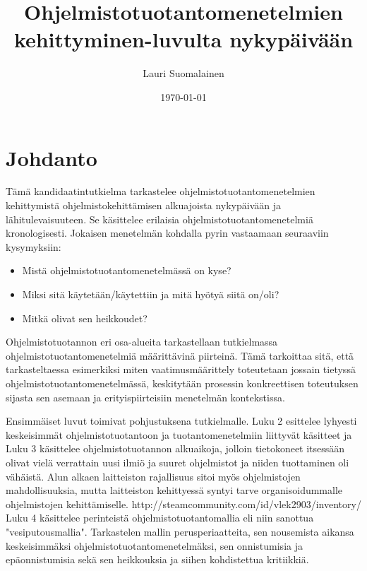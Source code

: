 \documentclass[finnish,12pt]{tktltiki2}
\title{Ohjelmistotuotantomenetelmien kehittyminen\newline 1950-luvulta nykypäivään}
\author{Lauri Suomalainen}
\date{\today}
\theoremstyle{definition}
\theoremstyle{remark}
\begin{document}

\frontmatter      %

\maketitle        %
\makeabstract     %

\tableofcontents  %


\mainmatter       %

\section{Johdanto}
\onehalfspacing

Tämä kandidaatintutkielma tarkastelee ohjelmistotuotantomenetelmien kehittymistä ohjelmistokehittämisen alkuajoista nykypäivään ja lähitulevaisuuteen. Se käsittelee erilaisia ohjelmistotuotantomenetelmiä kronologisesti. Jokaisen menetelmän kohdalla pyrin vastaamaan seuraaviin kysymyksiin:

\begin{itemize}
\item Mistä ohjelmistotuotantomenetelmässä on kyse?
\item Miksi sitä käytetään/käytettiin ja mitä hyötyä siitä on/oli?
\item Mitkä olivat sen heikkoudet?
\end{itemize}

Ohjelmistotuotannon eri osa-alueita tarkastellaan tutkielmassa ohjelmistotuotantomenetelmiä määrittävinä piirteinä. Tämä tarkoittaa sitä, että tarkasteltaessa esimerkiksi miten vaatimusmäärittely toteutetaan jossain tietyssä ohjelmistotuotantomenetelmässä, keskitytään prosessin konkreettisen toteutuksen sijasta sen asemaan ja erityispiirteisiin menetelmän kontekstissa.

Ensimmäiset luvut toimivat pohjustuksena tutkielmalle. Luku 2 esittelee lyhyesti keskeisimmät ohjelmistotuotantoon ja tuotantomenetelmiin liittyvät käsitteet ja Luku 3 käsittelee ohjelmistotuotannon alkuaikoja, jolloin tietokoneet itsessään olivat vielä verrattain uusi ilmiö ja suuret ohjelmistot ja niiden tuottaminen oli vähäistä. Alun alkaen laitteiston rajallisuus sitoi myös ohjelmistojen mahdollisuuksia, mutta laitteiston kehittyessä syntyi tarve organisoidummalle ohjelmistojen kehittämiselle.
http://steamcommunity.com/id/vlek2903/inventory/
Luku 4 käsittelee perinteistä ohjelmistotuotantomallia eli niin sanottua "vesiputousmallia". Tarkastelen mallin perusperiaatteita, sen nousemista aikansa keskeisimmäksi ohjelmistotuotantomenetelmäksi, sen onnistumisia ja epäonnistumisia sekä sen heikkouksia ja siihen kohdistettua kritiikkiä.
\end{document}
